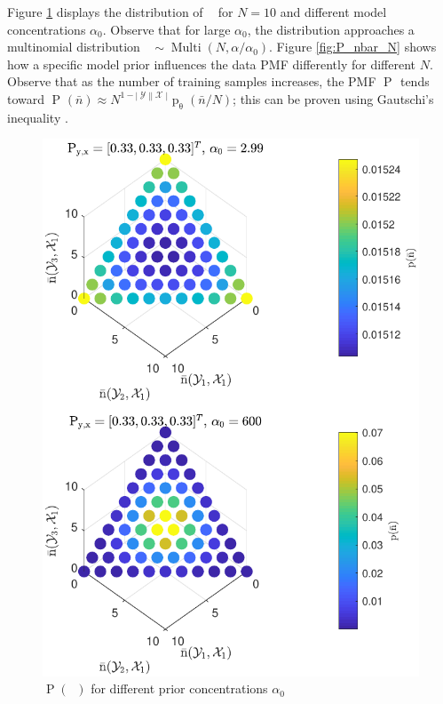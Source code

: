 \documentclass[12pt]{report}
\DeclareMathOperator{\nbarrm}{\bar{\mathrm{n}}}
\DeclareMathOperator{\Prm}{\mathrm{P}}
\DeclareMathOperator{\prm}{\mathrm{p}}
\DeclareMathOperator{\Xcal}{\mathcal{X}}
\DeclareMathOperator{\Ycal}{\mathcal{Y}}
\DeclareMathOperator{\Multi}{\mathrm{Multi}}
\begin{document}
Figure \ref{fig:P_nbar_a0} displays the distribution of $\nbarrm$ for $N=10$ and different model concentrations $\alpha_0$. Observe that for large $\alpha_0$, the distribution approaches a multinomial distribution $\nbarrm \sim \Multi(N,\alpha/\alpha_0)$. Figure \ref{fig:P_nbar_N} shows how a specific model prior influences the data PMF differently for different $N$. Observe that as the number of training samples increases, the PMF $\Prm_{\nbarrm}$ tends toward $\Prm_{\nbarrm}(\bar{n}) \approx N^{1-|\Ycal||\Xcal|}\prm_{\uptheta}(\bar{n}/N)$; this can be proven using Gautschi's inequality \cite{wendel}.
\begin{figure}
\centering
\includegraphics[width=0.7\linewidth]{P_nbar_a0.pdf}
\caption{$\Prm(\nbarrm)$ for different prior concentrations $\alpha_0$}
\label{fig:P_nbar_a0}
\end{figure}
\end{document}
